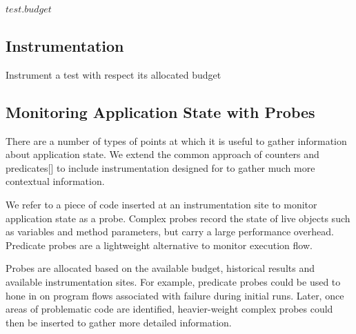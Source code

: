 {\begin{algorithm}[h]
\begin{algorithmic}[1]
	\State \Return $test.budget$

	\EndFunction
\end{algorithmic}
\end{algorithm}


\subsection{Instrumentation}


\begin{algorithm}[H]
\caption{Instrument a test with respect its allocated budget}
\label{alg:instrument}
\begin{algorithmic}
			\Else
			\EndIf
		\EndFor
	\EndWhile
\end{algorithmic}
\end{algorithm}


\subsection{Monitoring Application State with Probes}

There are a number of types of points at which it is useful to gather information about application state. We extend the common approach of counters and predicates[] to include instrumentation designed for to gather much more contextual information.

We refer to a piece of code inserted at an instrumentation site to monitor application state as a probe. Complex probes record the state of live objects such as variables and method parameters, but carry a large performance overhead. Predicate probes are a lightweight alternative to monitor execution flow.

Probes are allocated based on the available budget, historical results and available instrumentation sites. For example, predicate probes could be used to hone in on program flows associated with failure during initial runs. Later, once areas of problematic code are identified, heavier-weight complex probes could then be inserted to gather more detailed information.

}
